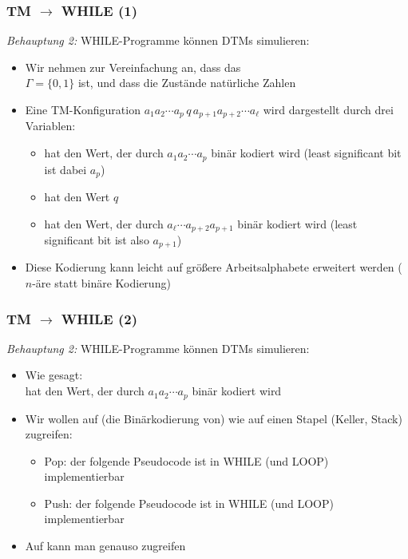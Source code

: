 \documentclass[aspectratio=1610,onlymath]{beamer}
\begin{document}
\begin{frame}[t]\frametitle{TM $\to$ WHILE (1)}

\emph{Behauptung 2:} WHILE-Programme können DTMs simulieren:\pause
\medskip

\begin{itemize}
\item Wir nehmen zur Vereinfachung an, dass das \\
$\Gamma=\{0,1\}$ ist, und dass die Zustände natürliche Zahlen 
\item Eine TM-Konfiguration $a_1 a_2 \cdots a_p \,q\, a_{p+1}a_{p+2}\cdots a_{\ell}$ wird dargestellt durch drei Variablen:
\begin{itemize}
\item {} hat den Wert, der durch $a_1 a_2 \cdots a_p$ binär kodiert wird (least significant bit ist dabei $a_p$)
\item {} hat den Wert $q$
\item {} hat den Wert, der durch $a_{\ell} \cdots a_{p+2} a_{p+1}$ binär kodiert wird (least significant bit ist also $a_{p+1}$)
\end{itemize}
\item Diese Kodierung kann leicht auf größere Arbeitsalphabete erweitert werden ($n$-äre statt binäre Kodierung)
\end{itemize}

\end{frame}


\begin{frame}[t]\frametitle{TM $\to$ WHILE (2)}

\emph{Behauptung 2:} WHILE-Programme können DTMs simulieren:
\medskip

\begin{itemize}
\item Wie gesagt:\\
 hat den Wert, der durch $a_1 a_2 \cdots a_p$ binär kodiert wird \pause
\item Wir wollen auf (die Binärkodierung von)  wie auf einen \alert{Stapel} (Keller, Stack) zugreifen:\pause
\begin{itemize}
\item \alert{Pop:} der folgende Pseudocode ist in WHILE (und LOOP) implementierbar 
\pause
\item \alert{Push:} der folgende Pseudocode ist in WHILE (und LOOP) implementierbar 
\end{itemize}
\item Auf  kann man genauso zugreifen
\end{itemize}

\end{frame}
\end{document}
